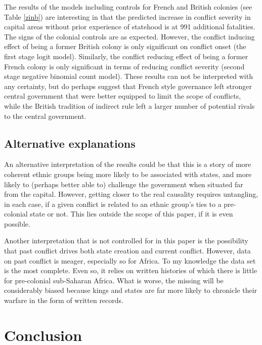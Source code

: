\documentclass[12pt]{article}
\begin{document}

The results of the models including controls for French and British colonies
(see Table \ref{zinb}) are interesting in that the predicted increase in conflict
severity in capital areas without prior experience of statehood is at 991
additional fatalities. The signs of the colonial controls are as
expected. However, the conflict inducing effect of being a former British
colony is only significant on conflict onset (the first stage logit
model). Similarly, the conflict reducing effect of being a former French colony
is only significant in terms of reducing conflict severity (second stage
negative binomial count model). These results can not be interpreted with any
certainty, but do perhaps suggest that French style governance left stronger
central government that were better equipped to limit the scope of conflicts,
while the British tradition of indirect rule left a larger number of potential
rivals to the central government.

\subsection{Alternative explanations} \label{Alternative explanations}

An alternative interpretation of the results could be that this is a
story of more coherent ethnic groups being more likely to be associated with
states, and more likely to (perhaps better able to) challenge the government
when situated far from the capital. However, getting closer to the real
causality requires untangling, in each case, if a given conflict is related to
an ethnic group's ties to a pre-colonial state or not. This lies outside the
scope of this paper, if it is even possible.

Another interpretation that is not controlled for in this paper is the
possibility that past conflict drives both state creation and current conflict.
However, data on past conflict is meager, especially so for Africa. To my
knowledge the \citet{Brecke1999} data set is the most complete. Even so, it
relies on written histories of which there is little for pre-colonial
sub-Saharan Africa. What is worse, the missing will be considerably biased
because kings and states are far more likely to chronicle their warfare in the
form of written records.

\section{Conclusion} \label{Conclusion}
\end{document}
